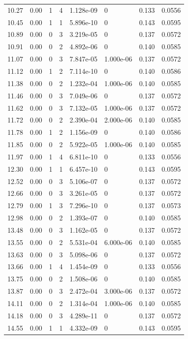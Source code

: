 \documentclass[preview]{standalone}
\begin{document}
{{{\begin{tabular}{L{1.2cm}C{1.2cm} C{0.3cm}C{0.5cm} C{1.4cm}C{1.4cm} C{1.4cm}C{1.4cm}}
  10.27  &  0.00  & 1     &  4 &  1.128e-09  & 0  & 0.133 &  0.0556   \\ 
  10.45  &  0.00  & 1     &  1 &  5.896e-10  & 0  & 0.143 &  0.0595   \\ 
  10.89  &  0.00  & 0     &  3 &  3.219e-05  & 0  & 0.137 &  0.0572   \\ 
  10.91  &  0.00  & 0     &  2 &  4.892e-06  & 0  & 0.140 &  0.0585   \\ 
  11.07  &  0.00  & 0     &  3 &  7.847e-05  & 1.000e-06  & 0.137 &  0.0572   \\ 
  11.12  &  0.00  & 1     &  2 &  7.114e-10  & 0  & 0.140 &  0.0586   \\ 
  11.38  &  0.00  & 0     &  2 &  1.232e-04  & 1.000e-06  & 0.140 &  0.0585   \\ 
  11.46  &  0.00  & 0     &  3 &  7.049e-06  & 0  & 0.137 &  0.0572   \\ 
  11.62  &  0.00  & 0     &  3 &  7.132e-05  & 1.000e-06  & 0.137 &  0.0572   \\ 
  11.72  &  0.00  & 0     &  2 &  2.390e-04  & 2.000e-06  & 0.140 &  0.0585   \\ 
  11.78  &  0.00  & 1     &  2 &  1.156e-09  & 0  & 0.140 &  0.0586   \\ 
  11.85  &  0.00  & 0     &  2 &  5.922e-05  & 1.000e-06  & 0.140 &  0.0585   \\ 
  11.97  &  0.00  & 1     &  4 &  6.811e-10  & 0  & 0.133 &  0.0556   \\ 
  12.30  &  0.00  & 1     &  1 &  6.457e-10  & 0  & 0.143 &  0.0595   \\ 
  12.52  &  0.00  & 0     &  3 &  5.106e-07  & 0  & 0.137 &  0.0572   \\ 
  12.66  &  0.00  & 0     &  3 &  3.261e-05  & 0  & 0.137 &  0.0572   \\ 
  12.79  &  0.00  & 1     &  3 &  7.296e-10  & 0  & 0.137 &  0.0573   \\ 
  12.98  &  0.00  & 0     &  2 &  1.393e-07  & 0  & 0.140 &  0.0585   \\ 
  13.48  &  0.00  & 0     &  3 &  1.162e-05  & 0  & 0.137 &  0.0572   \\ 
  13.55  &  0.00  & 0     &  2 &  5.531e-04  & 6.000e-06  & 0.140 &  0.0585   \\ 
  13.63  &  0.00  & 0     &  3 &  5.098e-06  & 0  & 0.137 &  0.0572   \\ 
  13.66  &  0.00  & 1     &  4 &  1.454e-09  & 0  & 0.133 &  0.0556   \\ 
  13.75  &  0.00  & 0     &  2 &  1.508e-06  & 0  & 0.140 &  0.0585   \\ 
  13.87  &  0.00  & 0     &  3 &  2.472e-04  & 3.000e-06  & 0.137 &  0.0572   \\ 
  14.11  &  0.00  & 0     &  2 &  1.314e-04  & 1.000e-06  & 0.140 &  0.0585   \\ 
  14.18  &  0.00  & 0     &  3 &  4.289e-11  & 0  & 0.137 &  0.0572   \\ 
  14.55  &  0.00  & 1     &  1 &  4.332e-09  & 0  & 0.143 &  0.0595   \\ 
\hline 
\end{tabular} 

}}}
\end{document}
